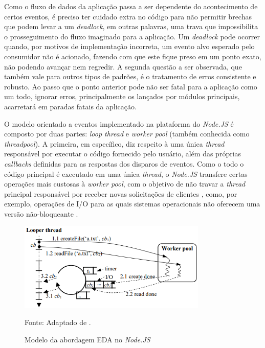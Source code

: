 \documentclass[12pt]{article}
\begin{document}
Como o fluxo de dados da aplicação passa a ser dependente do acontecimento de certos eventos, é preciso ter cuidado 
extra no código para não permitir brechas que podem levar a um \textit{deadlock},
em outras palavras, uma trava que impossibilita o prosseguimento do fluxo imaginado para a aplicação. Um 
\textit{deadlock} pode ocorrer quando, por motivos de implementação incorreta, um evento alvo esperado pelo
consumidor não é acionado, fazendo com que este fique preso em um ponto exato, não podendo avançar nem regredir.
A segunda questão a ser observada, que também vale para outros tipos de padrões, é o tratamento de erros consistente
e robusto. Ao passo que o ponto anterior pode não ser fatal para a aplicação como um todo, ignorar erros, principalmente
os lançados por módulos principais, acarretará em paradas fatais da aplicação. \cite[p. 28]{DIOGORESENDE}

O modelo orientado a eventos implementado na plataforma do \textit{Node.JS} é composto por duas partes: 
\textit{loop thread} e \textit{worker pool} (também conhecida como \textit{threadpool}). A primeira, em específico, 
diz respeito à uma única \textit{thread} responsável por executar o código fornecido pelo usuário, além 
das próprias \textit{callbacks} definidas para as respostas dos disparos de eventos. Como o todo o código principal 
é executado em uma única \textit{thread}, o \textit{Node.JS} transfere certas operações mais custosas à \textit{worker pool}, 
com o objetivo de não travar a \textit{thread} principal responsável por receber novas solicitações de clientes \cite{BUGS}, 
como, por exemplo, operações de I/O para as quais sistemas operacionais não oferecem uma versão não-bloqueante 
\cite{NODEBLOCKEVENTLOOP}. 

\begin{figure}[h]
\centering
\caption{Modelo da abordagem EDA no \textit{Node.JS}}
\includegraphics[width=0.8\textwidth]{images/eda-arch-nodejs.png}
\label{fig:nodejs_eda_model}

Fonte: Adaptado de \cite{BUGS}.
\end{figure}
\end{document}
